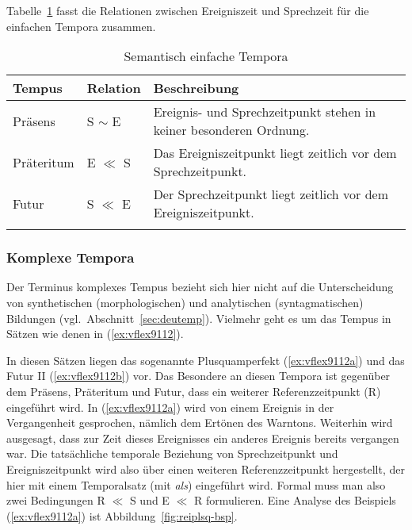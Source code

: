 Tabelle~\ref{tab:simptemp} fasst die Relationen zwischen Ereigniszeit und Sprechzeit für die einfachen Tempora zusammen.

\begin{table}
  \centering
  \begin{tabular}{llp{6cm}}
    \lsptoprule
    \textbf{Tempus} & \textbf{Relation} & \textbf{Beschreibung} \\
    \midrule
    Präsens & S $\sim$ E & Ereignis- und Sprechzeitpunkt stehen in keiner besonderen Ordnung. \\
    Präteritum & E $\ll$ S & Das Ereigniszeitpunkt liegt zeitlich vor dem Sprechzeitpunkt. \\
    Futur & S $\ll$ E & Der Sprechzeitpunkt liegt zeitlich vor dem Ereigniszeitpunkt. \\
    \lspbottomrule
  \end{tabular}
  \caption{Semantisch einfache Tempora}
  \label{tab:simptemp}
\end{table}

\subsubsection{Komplexe Tempora}

\label{sec:komptemp}

Der Terminus komplexes Tempus bezieht sich hier nicht auf die Unterscheidung von synthetischen (morphologischen) und analytischen (syntagmatischen) Bildungen (vgl.\ Abschnitt~\ref{sec:deutemp}).
Vielmehr geht es um das Tempus in Sätzen wie denen in (\ref{ex:vflex9112}).

\begin{exe}
  \ex\label{ex:vflex9112}
  \begin{xlist}
  \end{xlist}
\end{exe}


In diesen Sätzen liegen das sogenannte Plusquamperfekt (\ref{ex:vflex9112a}) und das Futur II (\ref{ex:vflex9112b}) vor.
Das Besondere an diesen Tempora ist gegenüber dem Präsens, Präteritum und Futur, dass ein weiterer Referenzzeitpunkt (R) eingeführt wird.
In (\ref{ex:vflex9112a}) wird von einem Ereignis in der Vergangenheit gesprochen, nämlich dem Ertönen des Warntons.
Weiterhin wird ausgesagt, dass zur Zeit dieses Ereignisses ein anderes Ereignis bereits vergangen war.
Die tatsächliche temporale Beziehung von Sprechzeitpunkt und Ereigniszeitpunkt wird also über einen weiteren Referenzzeitpunkt hergestellt, der hier mit einem Temporalsatz (mit \textit{als}) eingeführt wird.
Formal muss man also zwei Bedingungen R $\ll$ S und E $\ll$ R formulieren.
Eine Analyse des Beispiels (\ref{ex:vflex9112a}) ist Abbildung~\ref{fig:reiplsq-bsp}.

